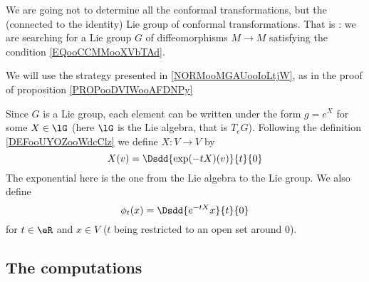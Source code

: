 \begin{remark}
    We are going not to determine all the conformal transformations, but the (connected to the identity) Lie group of conformal transformations. That is : we are searching for a Lie group \( G\) of diffeomorphisms \( M\to M\) satisfying the condition \eqref{EQooCCMMooXVbTAd}.
\end{remark}

We will use the strategy presented in \ref{NORMooMGAUooIoLtjW}, as in the proof of proposition \ref{PROPooDVIWooAFDNPy}

Since \( G\) is a Lie group, each element can be written under the form \( g= e^{X}\) for some \( X\in\lG\) (here \( \lG\) is the Lie algebra, that is \( T_eG\)). Following the definition \ref{DEFooUYOZooWdcClz} we define \( X\colon V\to V\) by
\begin{equation}
    X(v)=\Dsdd{  \exp(-tX)(v) }{t}{0}
\end{equation}
The exponential here is the one from the Lie algebra to the Lie group. We also define
\begin{equation}
    \phi_t(x)=\Dsdd{  e^{-tX}x }{t}{0}
\end{equation}
for \( t\in \eR\) and \( x\in V\) (\( t\) being restricted to an open set around \( 0\)). 

\subsection{The computations}

